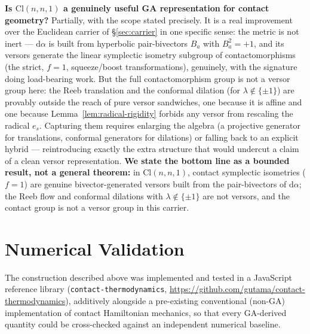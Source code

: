 \documentclass[11pt]{article}
\newcommand{\Cl}{\mathrm{Cl}}
\newcommand{\dif}{\mathrm{d}}
\begin{document}
\textbf{Is $\Cl(n,n,1)$ a genuinely useful GA representation for contact geometry?} Partially, with the scope stated precisely. It is a real improvement over the Euclidean carrier of \S\ref{sec:carrier} in one specific sense: the metric is not inert — $\dif\alpha$ is built from hyperbolic pair-bivectors $B_a$ with $B_a^2=+1$, and its versors generate the linear symplectic isometry subgroup of contactomorphisms (the strict, $f=1$, squeeze/boost transformations), genuinely, with the signature doing load-bearing work. But the full contactomorphism group is not a versor group here: the Reeb translation and the conformal dilation (for $\lambda\notin\{\pm1\}$) are provably outside the reach of pure versor sandwiches, one because it is affine and one because Lemma~\ref{lem:radical-rigidity} forbids any versor from rescaling the radical $e_s$. Capturing them requires enlarging the algebra (a projective generator for translations, conformal generators for dilations) or falling back to an explicit hybrid — reintroducing exactly the extra structure that would undercut a claim of a clean versor representation. \textbf{We state the bottom line as a bounded result, not a general theorem:} in $\Cl(n,n,1)$, contact symplectic isometries ($f=1$) are genuine bivector-generated versors built from the pair-bivectors of $\dif\alpha$; the Reeb flow and conformal dilations with $\lambda\notin\{\pm1\}$ are not versors, and the contact group is not a versor group in this carrier.

\section{Numerical Validation}
\label{sec:validation}

The construction described above was implemented and tested in a JavaScript reference library (\texttt{contact-thermodynamics}, \url{https://github.com/gutama/contact-thermodynamics}), additively alongside a pre-existing conventional (non-GA) implementation of contact Hamiltonian mechanics, so that every GA-derived quantity could be cross-checked against an independent numerical baseline.
\end{document}
